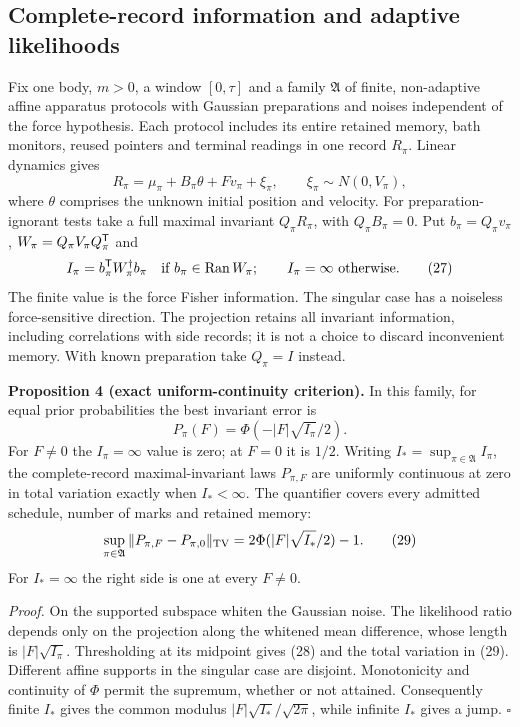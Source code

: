 \documentclass[11pt,a4paper]{article}
\begin{document}
\hypertarget{complete-record-information-and-adaptive-likelihoods}{%
\subsection{Complete-record information and adaptive
likelihoods}\label{complete-record-information-and-adaptive-likelihoods}}

Fix one body, \(m>0\), a window \([0,\tau]\) and a family
\(\mathfrak A\) of finite, non-adaptive affine apparatus protocols with
Gaussian preparations and noises independent of the force hypothesis.
Each protocol includes its entire retained memory, bath monitors, reused
pointers and terminal readings in one record \(R_\pi\). Linear dynamics
gives \[R_\pi=\mu_\pi+B_\pi\theta+Fv_\pi+\xi_\pi,
\qquad\xi_\pi\sim N(0,V_\pi),\tag{26}\] where \(\theta\) comprises the
unknown initial position and velocity. For preparation-ignorant tests
take a full maximal invariant \(Q_\pi R_\pi\), with \(Q_\pi B_\pi=0\).
Put \(b_\pi=Q_\pi v_\pi\), \(W_\pi=Q_\pi V_\pi Q_\pi^{\sf T}\) and
\[I_\pi=b_\pi^{\sf T}W_\pi^\dagger b_\pi
\quad\text{if }b_\pi\in\operatorname{Ran}W_\pi;
\qquad I_\pi=\infty\text{ otherwise}.\tag{27}\] The finite value is the
force Fisher information. The singular case has a noiseless
force-sensitive direction. The projection retains all invariant
information, including correlations with side records; it is not a
choice to discard inconvenient memory. With known preparation take
\(Q_\pi=I\) instead.

\textbf{Proposition 4 (exact uniform-continuity criterion).} In this
family, for equal prior probabilities the best invariant error is
\[P_\pi(F)=\Phi(-|F|\sqrt{I_\pi}/2).
\tag{28}\] For \(F\ne0\) the \(I_\pi=\infty\) value is zero; at \(F=0\)
it is \(1/2\). Writing \(I_*=\sup_{\pi\in\mathfrak A}I_\pi\), the
complete-record maximal-invariant laws \(P_{\pi,F}\) are uniformly
continuous at zero in total variation exactly when \(I_*<\infty\). The
quantifier covers every admitted schedule, number of marks and retained
memory: \[\sup_{\pi\in\mathfrak A}\|P_{\pi,F}-P_{\pi,0}\|_{\rm TV}
=2\Phi(|F|\sqrt{I_*}/2)-1.\tag{29}\] For \(I_*=\infty\) the right side
is one at every \(F\ne0\).

\emph{Proof.} On the supported subspace whiten the Gaussian noise. The
likelihood ratio depends only on the projection along the whitened mean
difference, whose length is \(|F|\sqrt{I_\pi}\). Thresholding at its
midpoint gives (28) and the total variation in (29). Different affine
supports in the singular case are disjoint. Monotonicity and continuity
of \(\Phi\) permit the supremum, whether or not attained. Consequently
finite \(I_*\) gives the common modulus \(|F|\sqrt{I_*}/\sqrt{2\pi}\),
while infinite \(I_*\) gives a jump. \(\square\)
\end{document}
